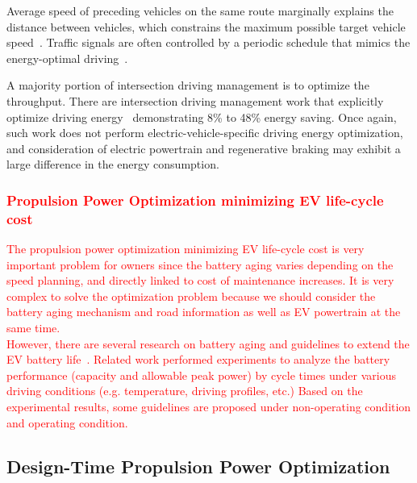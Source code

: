 Average speed of preceding vehicles on the same route marginally explains the distance between vehicles, which constrains the maximum possible target vehicle speed~\cite{Mensing:TR13,Lim:TVT17}. Traffic signals are often controlled by a periodic schedule that mimics the energy-optimal driving~\cite{Mandava:ITSC09,Asadi:TCST11,Ozatay:CDC13,Nunzio:JRNC15,Wu:ITS15}.

A majority portion of intersection driving management is to optimize the throughput. There are intersection driving management work that explicitly optimize driving energy~\cite{Nunzio:JRNC15,Wu:ITS15} demonstrating 8\% to 48\% energy saving. Once again, such work does not perform electric-vehicle-specific driving energy optimization, and consideration of electric powertrain and regenerative braking may exhibit a large difference in the energy consumption.
\textcolor{red}{
\subsubsection{Propulsion Power Optimization minimizing EV life-cycle cost} \label{subsubsec:opt_life_cycle}
The propulsion power optimization minimizing EV life-cycle cost is very important problem for owners since the battery aging varies depending on the speed planning, and directly linked to cost of maintenance increases.
It is very complex to solve the optimization problem because we should consider the battery aging mechanism and road information as well as EV powertrain at the same time.\\
%
However, there are several research on battery aging and guidelines to extend the EV battery life~\cite{Sarre:JPS04,Keil:PHD17}. Related work performed experiments to analyze the battery performance (capacity and allowable peak power) by cycle times under various driving conditions (e.g. temperature, driving profiles, etc.) Based on the experimental results, some guidelines are proposed under non-operating condition and operating condition.}
\subsection{Design-Time Propulsion Power Optimization} \label{subsec:propulsion_design_time_opt}

